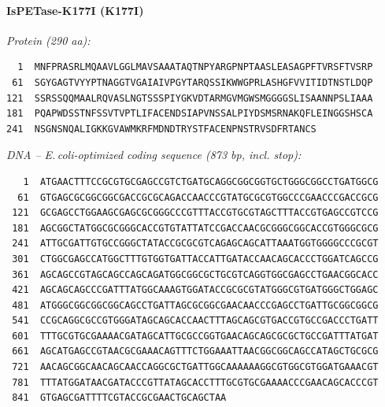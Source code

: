 \documentclass[11pt]{article}
\begin{document}
\paragraph{IsPETase-K177I  (K177I)}
\noindent\textit{Protein (290 aa):}
\begin{verbatim}
  1  MNFPRASRLMQAAVLGGLMAVSAAATAQTNPYARGPNPTAASLEASAGPFTVRSFTVSRP
 61  SGYGAGTVYYPTNAGGTVGAIAIVPGYTARQSSIKWWGPRLASHGFVVITIDTNSTLDQP
121  SSRSSQQMAALRQVASLNGTSSSPIYGKVDTARMGVMGWSMGGGGSLISAANNPSLIAAA
181  PQAPWDSSTNFSSVTVPTLIFACENDSIAPVNSSALPIYDSMSRNAKQFLEINGGSHSCA
241  NSGNSNQALIGKKGVAWMKRFMDNDTRYSTFACENPNSTRVSDFRTANCS
\end{verbatim}
\medskip
\noindent\textit{DNA -- E.\,coli-optimized coding sequence (873 bp, incl. stop):}
\begin{verbatim}
   1  ATGAACTTTCCGCGTGCGAGCCGTCTGATGCAGGCGGCGGTGCTGGGCGGCCTGATGGCG
  61  GTGAGCGCGGCGGCGACCGCGCAGACCAACCCGTATGCGCGTGGCCCGAACCCGACCGCG
 121  GCGAGCCTGGAAGCGAGCGCGGGCCCGTTTACCGTGCGTAGCTTTACCGTGAGCCGTCCG
 181  AGCGGCTATGGCGCGGGCACCGTGTATTATCCGACCAACGCGGGCGGCACCGTGGGCGCG
 241  ATTGCGATTGTGCCGGGCTATACCGCGCGTCAGAGCAGCATTAAATGGTGGGGCCCGCGT
 301  CTGGCGAGCCATGGCTTTGTGGTGATTACCATTGATACCAACAGCACCCTGGATCAGCCG
 361  AGCAGCCGTAGCAGCCAGCAGATGGCGGCGCTGCGTCAGGTGGCGAGCCTGAACGGCACC
 421  AGCAGCAGCCCGATTTATGGCAAAGTGGATACCGCGCGTATGGGCGTGATGGGCTGGAGC
 481  ATGGGCGGCGGCGGCAGCCTGATTAGCGCGGCGAACAACCCGAGCCTGATTGCGGCGGCG
 541  CCGCAGGCGCCGTGGGATAGCAGCACCAACTTTAGCAGCGTGACCGTGCCGACCCTGATT
 601  TTTGCGTGCGAAAACGATAGCATTGCGCCGGTGAACAGCAGCGCGCTGCCGATTTATGAT
 661  AGCATGAGCCGTAACGCGAAACAGTTTCTGGAAATTAACGGCGGCAGCCATAGCTGCGCG
 721  AACAGCGGCAACAGCAACCAGGCGCTGATTGGCAAAAAAGGCGTGGCGTGGATGAAACGT
 781  TTTATGGATAACGATACCCGTTATAGCACCTTTGCGTGCGAAAACCCGAACAGCACCCGT
 841  GTGAGCGATTTTCGTACCGCGAACTGCAGCTAA
\end{verbatim}
\bigskip
\end{document}

